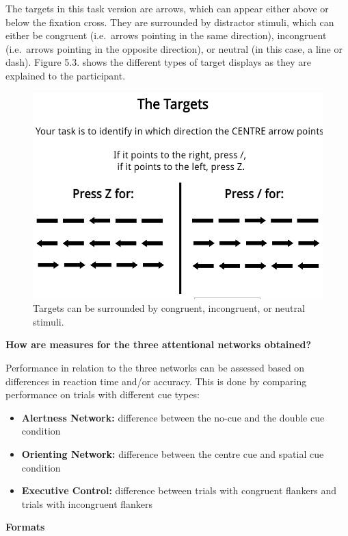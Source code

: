 \documentclass[
]{book}
\providecommand{\tightlist}{%
  \setlength{\itemsep}{0pt}\setlength{\parskip}{0pt}}
\begin{document}
The targets in this task version are arrows, which can appear either above or below the fixation cross. They are surrounded by distractor stimuli, which can either be congruent (i.e.~arrows pointing in the same direction), incongruent (i.e.~arrows pointing in the opposite direction), or neutral (in this case, a line or dash). Figure 5.3. shows the different types of target displays as they are explained to the participant.

\begin{figure}

{\centering \includegraphics[width=0.8\linewidth]{images/ANT_Targets} 

}

\caption{Targets can be surrounded by congruent, incongruent, or neutral stimuli.}\label{fig:Figure2-3}
\end{figure}

\textbf{How are measures for the three attentional networks obtained?}

Performance in relation to the three networks can be assessed based on differences in reaction time and/or accuracy. This is done by comparing performance on trials with different cue types:

\begin{itemize}
\tightlist
\item
  \textbf{Alertness Network:} difference between the no-cue and the double cue condition
\item
  \textbf{Orienting Network:} difference between the centre cue and spatial cue condition
\item
  \textbf{Executive Control:} difference between trials with congruent flankers and trials with incongruent flankers
\end{itemize}

\textbf{Formats}
\end{document}
